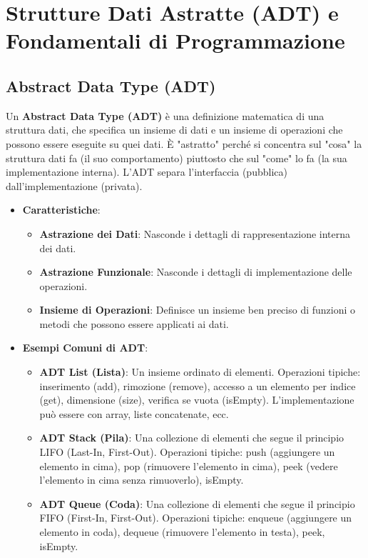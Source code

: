 \section{Strutture Dati Astratte (ADT) e Fondamentali di Programmazione}

\subsection{Abstract Data Type (ADT)}
Un \textbf{Abstract Data Type (ADT)} è una definizione matematica di una struttura dati, che specifica un insieme di dati e un insieme di operazioni che possono essere eseguite su quei dati. È "astratto" perché si concentra sul "cosa" la struttura dati fa (il suo comportamento) piuttosto che sul "come" lo fa (la sua implementazione interna). L'ADT separa l'interfaccia (pubblica) dall'implementazione (privata).

\begin{itemize}
    \item \textbf{Caratteristiche}:
    \begin{itemize}
        \item \textbf{Astrazione dei Dati}: Nasconde i dettagli di rappresentazione interna dei dati.
        \item \textbf{Astrazione Funzionale}: Nasconde i dettagli di implementazione delle operazioni.
        \item \textbf{Insieme di Operazioni}: Definisce un insieme ben preciso di funzioni o metodi che possono essere applicati ai dati.
    \end{itemize}
    \item \textbf{Esempi Comuni di ADT}:
    \begin{itemize}
        \item \textbf{ADT List (Lista)}: Un insieme ordinato di elementi. Operazioni tipiche: inserimento (add), rimozione (remove), accesso a un elemento per indice (get), dimensione (size), verifica se vuota (isEmpty). L'implementazione può essere con array, liste concatenate, ecc.
        \item \textbf{ADT Stack (Pila)}: Una collezione di elementi che segue il principio LIFO (Last-In, First-Out). Operazioni tipiche: push (aggiungere un elemento in cima), pop (rimuovere l'elemento in cima), peek (vedere l'elemento in cima senza rimuoverlo), isEmpty.
        \item \textbf{ADT Queue (Coda)}: Una collezione di elementi che segue il principio FIFO (First-In, First-Out). Operazioni tipiche: enqueue (aggiungere un elemento in coda), dequeue (rimuovere l'elemento in testa), peek, isEmpty.
    \end{itemize}
\end{itemize}

